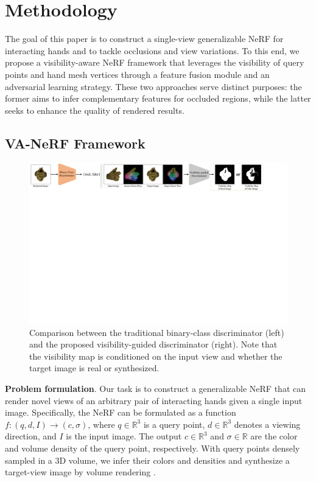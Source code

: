 \documentclass[letterpaper]{article}
\begin{document}
\section{Methodology}
The goal of this paper is to construct a single-view generalizable NeRF for interacting hands and to tackle occlusions and view variations. To this end, we propose a visibility-aware NeRF framework that leverages the visibility of query points and hand mesh vertices through a feature fusion module and an adversarial learning strategy. These two approaches serve distinct purposes: the former aims to infer complementary features for occluded regions, while the latter seeks to enhance the quality of rendered results.

\subsection{VA-NeRF Framework}
\label{sec:framework}

\begin{figure}[t]
  \centering
  \includegraphics[width=1.0\hsize]{figures/dis.pdf}
  \caption{Comparison between the traditional binary-class discriminator (left) and the proposed visibility-guided discriminator (right). Note that the visibility map is conditioned on the input view and whether the target image is real or synthesized.}
  \label{fig:dis}
\end{figure}

\textbf{Problem formulation}. Our task is to construct a generalizable NeRF that can render novel views of an arbitrary pair of interacting hands given a single input image. Specifically, the NeRF can be formulated as a function $f:(q,d,I)  \to (c, \sigma)$, where $q \in \mathbb{R}^3$ is a query point, $d \in \mathbb{R}^3$ denotes a viewing direction, and $I$ is the input image. The output $c \in \mathbb{R}^3$ and $\sigma \in \mathbb{R}$ are the color and volume density of the query point, respectively. With query points densely sampled in a 3D volume, we infer their colors and densities and synthesize a target-view image by volume rendering \cite{mildenhall2021nerf}.
\end{document}
